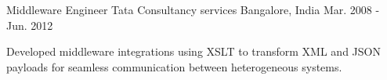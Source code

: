 \begin{cventries}
  \cventry
    {Middleware Engineer} %
    {Tata Consultancy services} %
    {Bangalore, India} %
    {Mar. 2008 - Jun. 2012} %
    {
      \begin{cvitems} %
        \item {Developed middleware integrations using XSLT to transform XML and JSON payloads for seamless communication between heterogeneous systems.}
      \end{cvitems}
    }
    
\end{cventries}